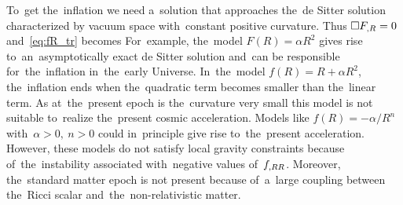 To~get the~inflation we need a~solution that approaches the~de Sitter solution characterized by vacuum space with~constant positive curvature. Thus $\Box F_{,R}=0$ and~\eqref{eq:fR_tr} becomes
For~example, the~model $F(R)=\alpha R^2$ gives rise to~an~asymptotically exact de Sitter solution and~can be responsible for~the~inflation in~the~early Universe. In~the~model $f(R) = R + \alpha R^2$, the~inflation ends when the~quadratic term becomes smaller than the~linear term. As at~the~present epoch is the~curvature very small this model is not suitable to~realize the~present cosmic acceleration. Models like $f(R)=-\alpha/R^n$ with~$\alpha>0,\ n>0$ could in~principle give rise to~the~present acceleration. However, these models do not satisfy local gravity constraints because of~the~instability associated with~negative values of~$f_{,RR}$. Moreover, the~standard matter epoch is not present because of~a~large coupling between the~Ricci scalar and~the~non-relativistic matter.

